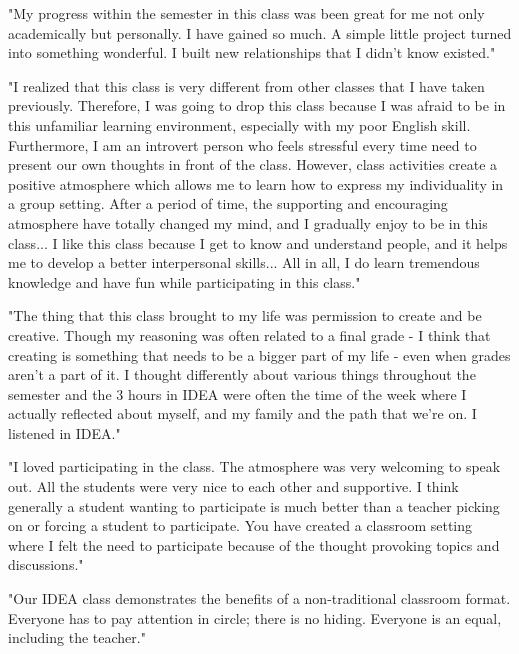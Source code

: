 \documentclass[letterpaper,10pt,headsepline]{scrreprt}
\begin{document}
"My progress within the semester in this class was been great for me not only academically but personally. I have gained so much. A simple little project turned into something wonderful. I built new relationships that I didn’t know existed."
\vspace{2em}

"I realized that this class is very different from other classes that I have taken previously. Therefore, I was going to drop this class because I was afraid to be in this unfamiliar learning environment, especially with my poor English skill. Furthermore, I am an introvert person who feels stressful every time need to present our own thoughts in front of the class. However, class activities create a positive atmosphere which allows me to learn how to express my individuality in a group setting. After a period of time, the supporting and encouraging atmosphere have totally changed my mind, and I gradually enjoy to be in this class... I like this class because I get to know and understand people, and it helps me to develop a better interpersonal skills... All in all, I do learn tremendous knowledge and have fun while participating in this class."
\vspace{2em}

"The thing that this class brought to my life was permission to create and be creative. Though my reasoning was often related to a final grade - I think that creating is something that needs to be a bigger part of my life - even when grades aren't a part of it. I thought differently about various things throughout the semester and the 3 hours in IDEA were often the time of the week where I actually reflected about myself, and my family and the path that we're on. I listened in IDEA."
\vspace{2em}

"I loved participating in the class. The atmosphere was very welcoming to speak out. All the students were very nice to each other and supportive. I think generally a student wanting to participate is much better than a teacher picking on or forcing a student to participate. You have created a classroom setting where I felt the need to participate because of the thought provoking topics and discussions."
\vspace{2em}

"Our IDEA class demonstrates the benefits of a non-traditional classroom format. Everyone has to pay attention in circle; there is no hiding. Everyone is an equal, including the teacher."
\vspace{2em}
\end{document}
